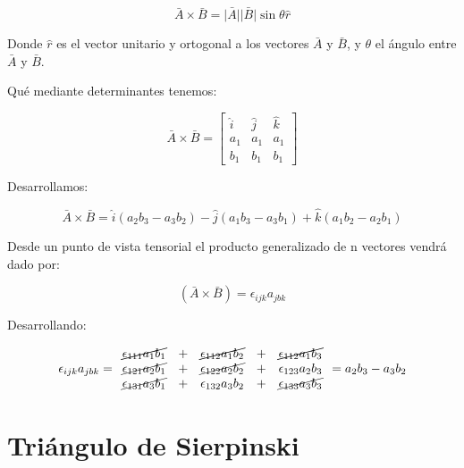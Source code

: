 \documentclass{article}
\providecommand{\abs}[1]{\lvert#1\rvert}
\begin{document}
\begin{equation}
    \bar{A} \times \bar{B}= \bar{\abs{A}} \bar{\abs{B}} \sin \theta \hat{r}
\end{equation}

Donde $\hat{r}$ es el vector unitario y ortogonal a los vectores $\bar{A}$ y
$\bar{B}$, y $\theta$ el ángulo entre $\bar{A}$ y $\bar{B}$.

Qué mediante determinantes tenemos:

\begin{equation}
    \bar{A} \times \bar{B}=
    \begin{bmatrix}
        \hat{i} & \hat{j} & \hat{k}\\ 
         a_1 & a_1 & a_1\\ 
         b_1 & b_1 & b_1
    \end{bmatrix}
\end{equation}

Desarrollamos:

\begin{equation}
    \bar{A} \times \bar{B}= \hat{i}(a_2 b_3 - a_3 b_2) - \hat{j}(a_1 b_3 - a_3 b_1) + \hat{k}(a_1 b_2 - a_2 b_1)
\end{equation}

Desde un punto de vista tensorial el producto generalizado de n vectores vendrá
dado por:

\begin{equation}
    (\bar{A} \times \bar{B}) = \epsilon_{ijk} a_{jbk}
\end{equation}

Desarrollando:

\begin{equation}
    \epsilon_{ijk} a_{jbk} =
    \begin{array}{ccccc}
        \cancel{\epsilon_{111} a_1 b_1} & + & \cancel{\epsilon_{112} a_1 b_2}   & + & \cancel{\epsilon_{112} a_1 b_3}   \\
        \cancel{\epsilon_{121} a_2 b_1} & + & \cancel{\epsilon_{122} a_2 b_2}   & + & \epsilon_{123} a_2 b_3            \\
        \cancel{\epsilon_{131} a_3 b_1} & + & \epsilon_{132} a_3 b_2            & + & \cancel{\epsilon_{133} a_3 b_3}
    \end{array}
    = a_2 b_3 - a_3 b_2
\end{equation}

\section{Tri\'angulo de Sierpinski}
\end{document}
